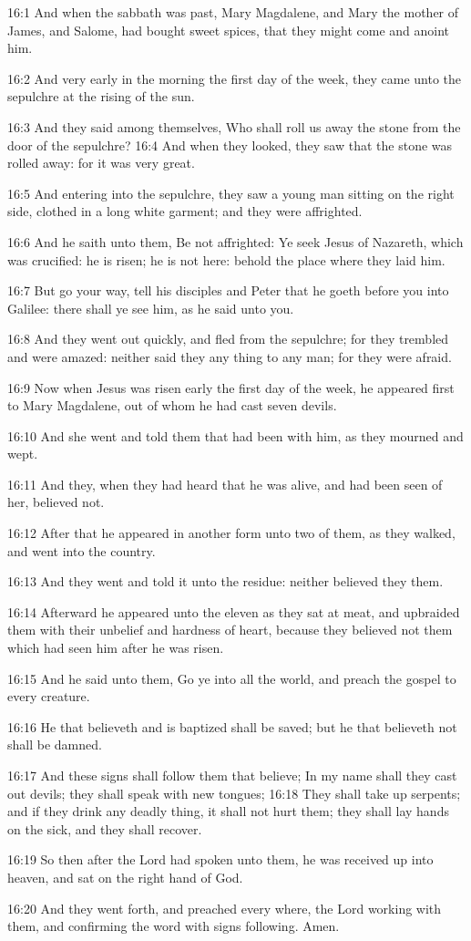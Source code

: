 16:1 And when the sabbath was past, Mary Magdalene, and Mary the
mother of James, and Salome, had bought sweet spices, that they might
come and anoint him.

16:2 And very early in the morning the first day of the week, they
came unto the sepulchre at the rising of the sun.

16:3 And they said among themselves, Who shall roll us away the stone
from the door of the sepulchre?  16:4 And when they looked, they saw
that the stone was rolled away: for it was very great.

16:5 And entering into the sepulchre, they saw a young man sitting on
the right side, clothed in a long white garment; and they were
affrighted.

16:6 And he saith unto them, Be not affrighted: Ye seek Jesus of
Nazareth, which was crucified: he is risen; he is not here: behold the
place where they laid him.

16:7 But go your way, tell his disciples and Peter that he goeth
before you into Galilee: there shall ye see him, as he said unto you.

16:8 And they went out quickly, and fled from the sepulchre; for they
trembled and were amazed: neither said they any thing to any man; for
they were afraid.

16:9 Now when Jesus was risen early the first day of the week, he
appeared first to Mary Magdalene, out of whom he had cast seven
devils.

16:10 And she went and told them that had been with him, as they
mourned and wept.

16:11 And they, when they had heard that he was alive, and had been
seen of her, believed not.

16:12 After that he appeared in another form unto two of them, as they
walked, and went into the country.

16:13 And they went and told it unto the residue: neither believed
they them.

16:14 Afterward he appeared unto the eleven as they sat at meat, and
upbraided them with their unbelief and hardness of heart, because they
believed not them which had seen him after he was risen.

16:15 And he said unto them, Go ye into all the world, and preach the
gospel to every creature.

16:16 He that believeth and is baptized shall be saved; but he that
believeth not shall be damned.

16:17 And these signs shall follow them that believe; In my name shall
they cast out devils; they shall speak with new tongues; 16:18 They
shall take up serpents; and if they drink any deadly thing, it shall
not hurt them; they shall lay hands on the sick, and they shall
recover.

16:19 So then after the Lord had spoken unto them, he was received up
into heaven, and sat on the right hand of God.

16:20 And they went forth, and preached every where, the Lord working
with them, and confirming the word with signs following. Amen.

